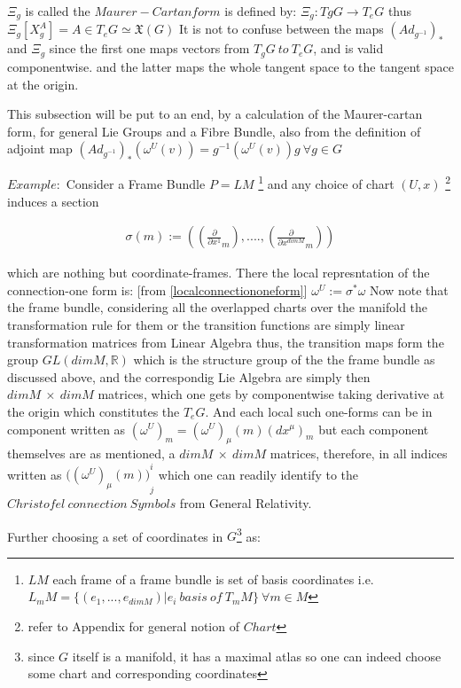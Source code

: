 \documentclass[8pt, twocoloumn]{article}
\begin{document}
 $\mathsf{\Xi}_{g}$ is called the $Maurer-Cartan form$ is defined by: $\mathsf{\Xi}_{g}: TgG \to T_eG$ thus $\mathsf{\Xi}_{g}[X^A_g] = A \in T_eG \simeq \mathfrak{X}(G)$ 
 It is not to confuse between the maps ${(Ad_{g^{-1}})}_{*}$ and $\mathsf{\Xi}_{g}$ since the first one maps vectors from $T_gG \ to \ T_eG$, and is valid componentwise. and the latter maps the  whole tangent space to the tangent space at the origin.
 
 This subsection will be put to an end, by a calculation of the Maurer-cartan form, for general Lie Groups and a Fibre Bundle, also from the definition of adjoint map ${(Ad_{g^{-1}})}_{*}(\omega^{U}(v)) = g^{-1} (\omega^{U}(v)) g \ \forall g \in G$
 
 $Example:$ Consider a Frame Bundle $P =LM$ \footnote{$LM$ each frame of a frame bundle is set of basis coordinates i.e. $L_mM = \{ (e_1, . . ., e_{dim M}) | e_i \  basis \ of \ T_mM\} \ \forall m \in M$} and any choice of chart $(U, x)$ \footnote{refer to Appendix for general notion of $Chart$}  induces a section
 
 \begin{align}
     \sigma(m) := ({(\frac{\partial }{\partial x^{1}}_{m})}, . . . . , {(\frac{\partial }{\partial x^{dim M}}_{m})})
 \end{align}

which are nothing but coordinate-frames. There the local represntation of the connection-one form is: [from \ref{localconnectiononeform}] $\omega^{U}:= \sigma^{*}\omega$
Now note that the frame bundle, considering all the overlapped charts over the manifold the transformation rule for them or the transition functions are simply linear transformation matrices from Linear Algebra thus, the transition maps form the group $GL(dim M, \mathbb{R})$ which is the structure group of the the frame bundle as discussed above, and the correspondig Lie Algebra are simply then $dim M \ \times \ dim M$ matrices, which one gets by componentwise taking derivative at the origin which constitutes the $T_eG$. And each local such one-forms can be in component written as ${(\omega^{U})}_m = {(\omega^{U})}_{\mu}(m){(dx^{\mu})}_{m}$ but each component themselves are as mentioned, a $dim M \ \times \ dim M$ matrices, therefore, in all indices written as $({{(\omega^{U})}_{\mu}(m))}^i_j$ which one can readily identify to the $Christofel \ connection \ Symbols$ from General Relativity. 

Further choosing a set of coordinates in $G$\footnote{since $G$ itself is a manifold, it has a maximal atlas so one can indeed choose some chart and corresponding coordinates} as:
\end{document}
